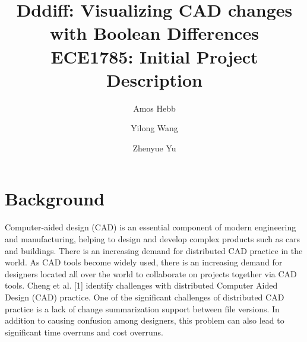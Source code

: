 \documentclass[sigconf,]{acmart}
\begin{document}
\title{Dddiff: Visualizing CAD changes with Boolean Differences\\
{\normalsize ECE1785: Initial Project Description}}

\author{Amos Hebb}
\author{Yilong Wang}
\author{Zhenyue Yu}
\makeatletter
\def\@ACM@checkaffil{%
    \if@ACM@instpresent\else
    \ClassWarningNoLine{\@classname}{No institution present for an affiliation}%
    \fi
    \if@ACM@citypresent\else
    \ClassWarningNoLine{\@classname}{No city present for an affiliation}%
    \fi
    \if@ACM@countrypresent\else
        \ClassWarningNoLine{\@classname}{No country present for an affiliation}%
    \fi
}
\makeatother
\maketitle





\section{Background}
Computer-aided design (CAD) is an essential component of modern engineering and manufacturing, helping to design and develop complex products such as cars and buildings. There is an increasing demand for distributed CAD practice in the world. As CAD tools become widely used, there is an increasing demand for designers located all over the world to collaborate on projects together via CAD tools. Cheng et al. [1] identify challenges with distributed Computer Aided Design (CAD) practice. One of the significant challenges of distributed CAD practice is a lack of change summarization support between file versions. In addition to causing confusion among designers, this problem can also lead to significant time overruns and cost overruns.
\end{document}
